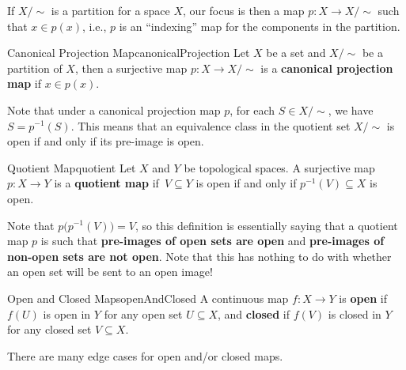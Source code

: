 \documentclass[math]{amznotes}
\theoremstyle{remark}
\begin{document}
If $X \slash \sim$ is a partition for a space $X$, our focus is then a map $p \colon X \to X \slash \sim$ such that $x \in p\left(x\right)$, i.e., $p$ is an ``indexing'' map for the components in the partition. 
\begin{dfnbox}{Canonical Projection Map}{canonicalProjection}
    Let $X$ be a set and $X \slash \sim$ be a partition of $X$, then a surjective map $p \colon X \to X \slash \sim$ is a {\color{red} \textbf{canonical projection map}} if $x \in p\left(x\right)$.
\end{dfnbox}
Note that under a canonical projection map $p$, for each $S \in X \slash \sim$, we have $S = p^{-1}\left(S\right)$. This means that an equivalence class in the quotient set $X \slash \sim$ is open if and only if its pre-image is open.
\begin{dfnbox}{Quotient Map}{quotient}
    Let $X$ and $Y$ be topological spaces. A surjective map $p \colon X \to Y$ is a {\color{red} \textbf{quotient map}} if~$V \subseteq Y$ is open if and only if $p^{-1}\left(V\right) \subseteq X$ is open.
\end{dfnbox}
Note that $p\bigl(p^{-1}\left(V\right)\bigr) = V$, so this definition is essentially saying that a quotient map $p$ is such that \textbf{pre-images of open sets are open} and \textbf{pre-images of non-open sets are not open}. Note that this has nothing to do with whether an open set will be sent to an open image!
\begin{dfnbox}{Open and Closed Maps}{openAndClosed}
    A continuous map $f \colon X \to Y$ is {\color{red} \textbf{open}} if $f\left(U\right)$ is open in $Y$ for any open set $U \subseteq X$, and {\color{red} \textbf{closed}} if $f\left(V\right)$ is closed in $Y$ for any closed set $V \subseteq X$.
\end{dfnbox}
There are many edge cases for open and/or closed maps.
\end{document}

